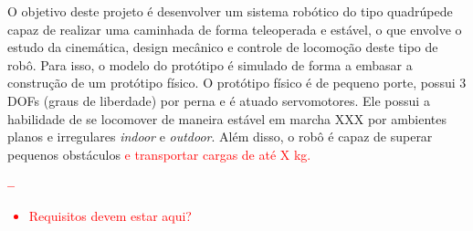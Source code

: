 \documentclass[../main.tex]{subfiles}
\begin{document}
  O objetivo deste projeto é desenvolver um sistema robótico do tipo quadrúpede capaz de realizar uma caminhada de forma teleoperada e estável, o que envolve o estudo da cinemática, design mecânico e controle de locomoção deste tipo de robô. Para isso, o modelo do protótipo é simulado de forma a embasar a construção de um protótipo físico. O protótipo físico é de pequeno porte, possui 3 DOFs (graus de liberdade) por perna e é atuado servomotores. Ele possui a habilidade de se locomover de maneira estável em marcha XXX por ambientes planos e irregulares \textit{indoor} e \textit{outdoor}. Além disso, o robô é capaz de superar pequenos obstáculos \textcolor{red}{e transportar cargas de até X kg.}

  \textcolor{red}{\textbf{--}
  \begin{itemize}
    \item Requisitos devem estar aqui?
  \end{itemize}
  }
\end{document}
